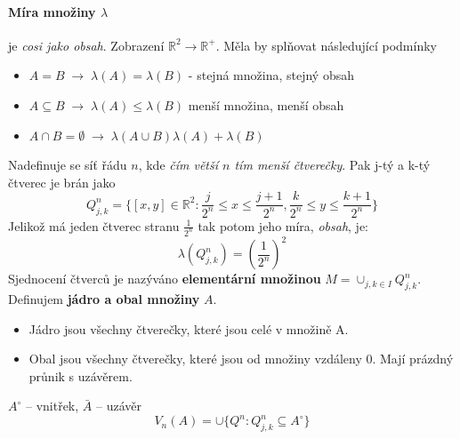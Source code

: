 \documentclass[a4paper, twoside,%
12pt]{article}
\newcommand{\R}{\mathbb{R}}
\begin{document}
\paragraph{Míra množiny $\lambda$} je \emph{cosi jako obsah}. Zobrazení $\R^2 \to \R^+$. Měla by splňovat následující podmínky
\begin{itemize}
    \item $A=B\; \rightarrow \; \lambda(A) = \lambda(B)$ - stejná množina, stejný obsah
    \item $A\subseteq B\; \rightarrow \; \lambda(A) \leq \lambda(B)$ menší množina, menší obsah
    \item $A\cap B = \emptyset\; \rightarrow \; \lambda(A\cup B ) \lambda(A) + \lambda(B)$
\end{itemize}
Nadefinuje se síť řádu $n$, kde \emph{čím větší $n$ tím menší čtverečky}. Pak j-tý a k-tý čtverec je brán jako
$$ Q_{j,k}^n = \lbrace [x,y]\in \R^2: \frac{j}{2^n} \leq x \leq \frac{j+1}{2^n}, \frac{k}{2^n} \leq y \leq \frac{k+1}{2^n}\rbrace $$
Jelikož má jeden čtverec stranu $\frac{1}{2^n}$ tak potom jeho míra, \emph{obsah}, je:
$$\lambda(Q_{j,k}^n ) = \left(\frac{1}{2^n}\right)^2$$
Sjednocení čtverců je nazýváno \textbf{elementární množinou} $M = \cup_{j,k\in I} Q_{j,k}^n$.
Definujem \textbf{jádro a obal množiny} $A$. 
\begin{itemize}
    \item Jádro jsou všechny čtverečky, které jsou celé v množině A.
    \item Obal jsou všechny čtverečky, které jsou od množiny vzdáleny 0. Mají prázdný průnik s uzávěrem.
\end{itemize} 
$A^\circ$ -- vnitřek, $\bar A$ -- uzávěr
$$ V_n (A) = \cup \lbrace  Q^n: Q_{j,k}^n \subseteq A^\circ \rbrace $$
\end{document}

